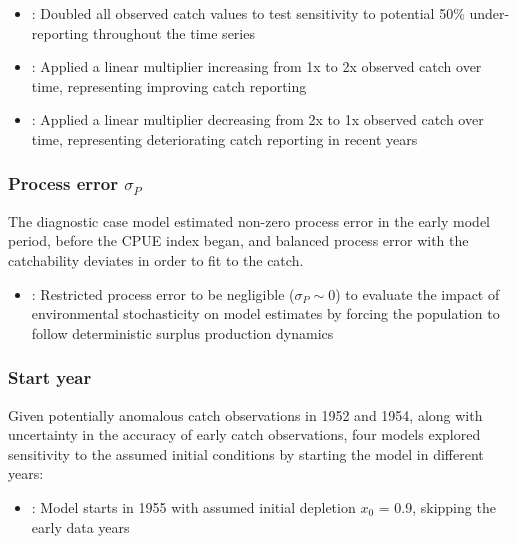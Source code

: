 \documentclass[
  11pt,
]{SCreport}
\providecommand{\tightlist}{%
  \setlength{\itemsep}{0pt}\setlength{\parskip}{0pt}}\usepackage{longtable,booktabs,array}
\begin{document}
\begin{itemize}
\tightlist
\item
  : Doubled all observed catch values to test
  sensitivity to potential 50\% under-reporting throughout the time
  series
\item
  : Applied a linear multiplier increasing from 1x to
  2x observed catch over time, representing improving catch reporting
\item
  : Applied a linear multiplier decreasing from 2x to
  1x observed catch over time, representing deteriorating catch
  reporting in recent years
\end{itemize}

\subsubsection{\texorpdfstring{Process error
\(\sigma_P\)}{Process error \textbackslash sigma\_P}}\label{sec-desc-sens-process}

The diagnostic case model estimated non-zero process error in the early
model period, before the CPUE index began, and balanced process error
with the catchability deviates in order to fit to the catch.

\begin{itemize}
\tightlist
\item
  : Restricted process error to be negligible
  (\(\sigma_P \sim 0\)) to evaluate the impact of environmental
  stochasticity on model estimates by forcing the population to follow
  deterministic surplus production dynamics
\end{itemize}

\subsubsection{Start year}\label{sec-desc-sens-start}

Given potentially anomalous catch observations in 1952 and 1954, along
with uncertainty in the accuracy of early catch observations, four
models explored sensitivity to the assumed initial conditions by
starting the model in different years:

\begin{itemize}
\tightlist
\item
  : Model starts in 1955 with assumed initial depletion
  \(x_0\) = 0.9, skipping the early data years
\end{itemize}
\end{document}

